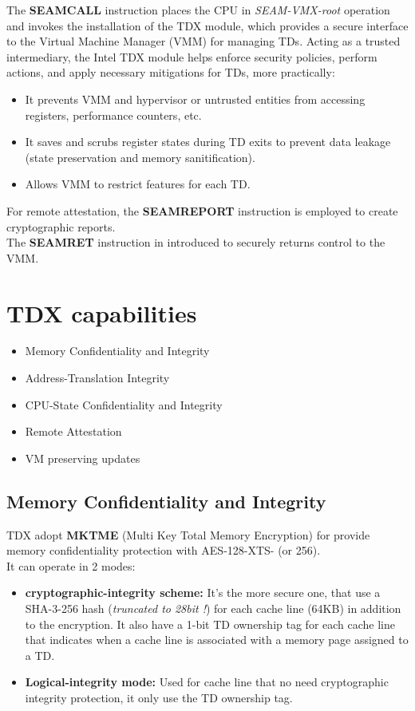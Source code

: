 The \textbf{SEAMCALL} instruction places the CPU in \textit{SEAM-VMX-root} operation and invokes the installation of the TDX module, which provides a secure interface to the Virtual Machine Manager (VMM) for managing TDs.
Acting as a trusted intermediary, the Intel TDX module helps enforce security policies, perform actions, and apply necessary mitigations for TDs, more practically:
\begin{itemize}
    \item It prevents VMM and hypervisor or untrusted entities from accessing registers, performance counters, etc.
    \item It saves and scrubs register states during TD exits to prevent data leakage (state preservation and memory sanitification).
    \item Allows VMM to restrict features for each TD.
\end{itemize}

For remote attestation, the \textbf{SEAMREPORT} instruction is employed to create cryptographic reports. \\ The \textbf{SEAMRET} instruction in introduced to securely returns control to the VMM.


\section{TDX capabilities}
\begin{itemize}
    \item Memory Confidentiality and Integrity
    \item Address-Translation Integrity
    \item CPU-State Confidentiality and Integrity
    \item Remote Attestation
    \item VM preserving updates
\end{itemize}

\subsection{Memory Confidentiality and Integrity}
TDX adopt \textbf{MKTME} (Multi Key Total Memory Encryption) for provide memory confidentiality protection with AES-128-XTS- (or 256). \\
It can operate in 2 modes:
\begin{itemize}
    \item \textbf{cryptographic-integrity scheme:} It's the more secure one, that use a SHA-3-256 hash (\textit{truncated to 28bit !}) for each cache line (64KB) in addition to the encryption. 
            It also have a 1-bit TD ownership tag for each cache line that indicates when a cache line is associated with a memory page assigned to a TD.
    \item \textbf{Logical-integrity mode:} Used for cache line that no need cryptographic integrity protection, it only use the TD ownership tag.
\end{itemize}

